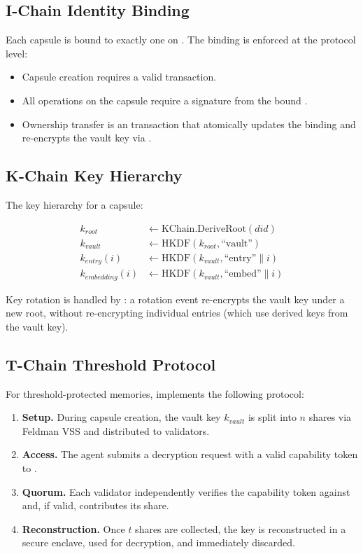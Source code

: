 \subsection{I-Chain Identity Binding}

Each capsule is bound to exactly one \DID{} on \IChain{}. The binding is enforced at the protocol level:

\begin{itemize}
    \item Capsule creation requires a valid \IChain{} \DID{} transaction.
    \item All operations on the capsule require a signature from the bound \DID{}.
    \item Ownership transfer is an \IChain{} transaction that atomically updates the \DID{} binding and re-encrypts the vault key via \KChain{}.
\end{itemize}

\subsection{K-Chain Key Hierarchy}

The key hierarchy for a capsule:

\begin{align}
k_{\textit{root}} &\leftarrow \text{KChain.DeriveRoot}(\textit{did}) \\
k_{\textit{vault}} &\leftarrow \text{HKDF}(k_{\textit{root}}, \text{``vault''}) \\
k_{\textit{entry}}(i) &\leftarrow \text{HKDF}(k_{\textit{vault}}, \text{``entry''} \| i) \\
k_{\textit{embedding}}(i) &\leftarrow \text{HKDF}(k_{\textit{vault}}, \text{``embed''} \| i)
\end{align}

Key rotation is handled by \KChain{}: a rotation event re-encrypts the vault key under a new root, without re-encrypting individual entries (which use derived keys from the vault key).

\subsection{T-Chain Threshold Protocol}

For threshold-protected memories, \TChain{} implements the following protocol:

\begin{enumerate}
    \item \textbf{Setup.} During capsule creation, the vault key $k_{\textit{vault}}$ is split into $n$ shares via Feldman VSS and distributed to \TChain{} validators.
    \item \textbf{Access.} The agent submits a decryption request with a valid capability token to \TChain{}.
    \item \textbf{Quorum.} Each validator independently verifies the capability token against \IChain{} and, if valid, contributes its share.
    \item \textbf{Reconstruction.} Once $t$ shares are collected, the key is reconstructed in a secure enclave, used for decryption, and immediately discarded.
\end{enumerate}

